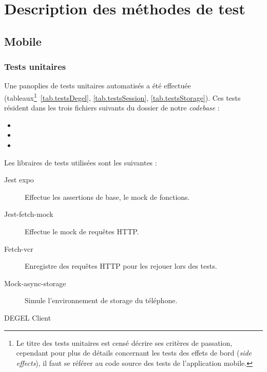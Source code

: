 \section{Description des méthodes de test}
    \subsection{Mobile}
        \subsubsection{Tests unitaires}
        Une panoplies de tests unitaires automatisés a été effectuée (tableaux\footnote{Le titre des tests unitaires est censé décrire ses critères de passation, cependant pour plus de détails concernant les tests des effets de bord (\emph{side effects}), il faut se référer au code source des tests de l'application mobile.}~\ref{tab.testsDegel}, \ref{tab.testsSession}, \ref{tab.testsStorage}). Ces tests résident dans les trois fichiers suivants du dossier  de notre \emph{codebase} : 
        \begin{itemize}
            \item {}
            \item {}
            \item {}
        \end{itemize}
        
        \noindent Les libraires de tests utilisées sont les suivantes :
        \begin{description}
            \item[Jest expo] Effectue les assertions de base, le mock de fonctions.
            \item [Jest-fetch-mock] Effectue le mock de requêtes HTTP.
            \item[Fetch-vcr] Enregistre des requêtes HTTP pour les rejouer lors des tests.
            \item[Mock-async-storage] Simule l'environnement de storage du téléphone.
        \end{description}
                
        \begin{table}[hp]
            \centering
            \caption{DEGEL Client}
            
            \label{tab.testsDegel}
        \end{table}
        
